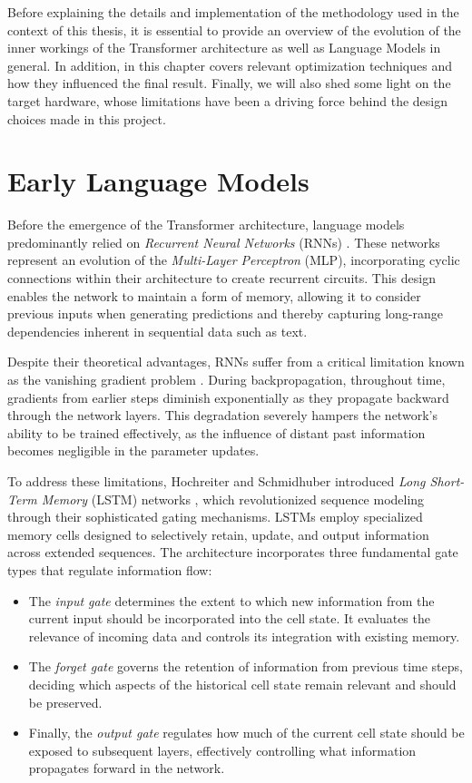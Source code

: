 Before explaining the details and implementation of the methodology used in the context of this thesis, it is essential to provide an overview of the evolution of the inner workings of the Transformer architecture as well as Language Models in general. In addition, in this chapter covers relevant optimization techniques and how they influenced the final result.
Finally, we will also shed some light on the target hardware, whose limitations have been a driving force behind the design choices made in this project.

\section{Early Language Models}
Before the emergence of the Transformer architecture, language models predominantly relied on \textit{Recurrent Neural Networks} (RNNs) . These networks represent an evolution of the \textit{Multi-Layer Perceptron} (MLP), incorporating cyclic connections within their architecture to create recurrent circuits. This design enables the network to maintain a form of memory, allowing it to consider previous inputs when generating predictions and thereby capturing long-range dependencies inherent in sequential data such as text.

Despite their theoretical advantages, RNNs suffer from a critical limitation known as the vanishing gradient problem \cite{rnn}. During backpropagation, throughout time, gradients from earlier steps diminish exponentially as they propagate backward through the network layers. This degradation severely hampers the network's ability to be trained effectively, as the influence of distant past information becomes negligible in the parameter updates.

To address these limitations, Hochreiter and Schmidhuber introduced \textit{Long Short-Term Memory} (LSTM) networks \cite{lstm}, which revolutionized sequence modeling through their sophisticated gating mechanisms. LSTMs employ specialized memory cells designed to selectively retain, update, and output information across extended sequences. The architecture incorporates three fundamental gate types that regulate information flow:
\begin{itemize}
    \item The \textit{input gate} determines the extent to which new information from the current input should be incorporated into the cell state. It evaluates the relevance of incoming data and controls its integration with existing memory.
    \item The \textit{forget gate} governs the retention of information from previous time steps, deciding which aspects of the historical cell state remain relevant and should be preserved.
    \item Finally, the \textit{output gate} regulates how much of the current cell state should be exposed to subsequent layers, effectively controlling what information propagates forward in the network.
\end{itemize}

